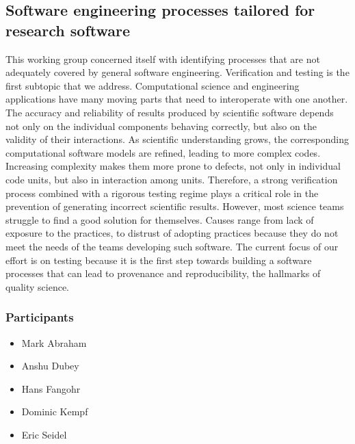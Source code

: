 \subsection{Software engineering processes tailored for research software}
\label{sec:soft-eng}


This working group concerned itself with identifying processes that are not adequately
covered by general software engineering. Verification and testing is
the first subtopic that we address.  
Computational science and engineering applications have many moving
parts that need to interoperate with one another. The accuracy and
reliability of results produced by scientific software depends not
only on the individual components behaving correctly, but also on the
validity of their interactions. 
As scientific understanding grows,
the corresponding computational software models are refined, leading
to more complex codes. Increasing complexity makes them more prone to
defects, not only in individual code units, but also in interaction
among units. Therefore, a strong verification process combined with a
rigorous testing regime plays a critical role in the prevention of
generating incorrect scientific results. However, most science teams
struggle to find a good solution for themselves. Causes range from
lack of exposure to the practices, to distrust of adopting practices
because they do not meet the needs of the teams developing such
software.  The current focus of our effort is on testing because it is the first step
towards building a software processes that can lead to provenance and
reproducibility, the hallmarks of quality science. 

\subsubsection{Participants}
\begin{itemize}
\item Mark Abraham
\item Anshu Dubey 
\item Hans Fangohr
\item Dominic Kempf
\item Eric Seidel
\end{itemize}

